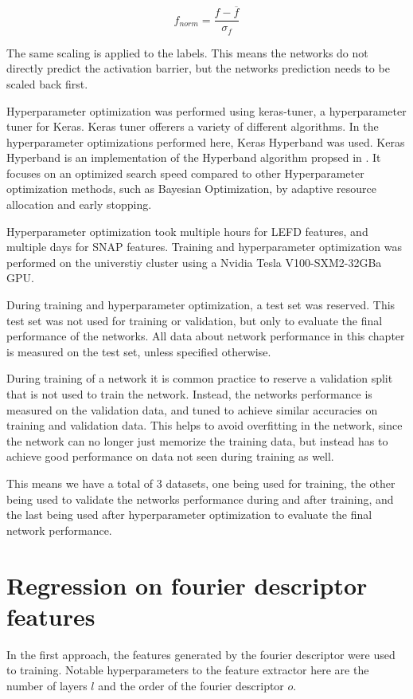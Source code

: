 $$
f_{norm} = \frac{f- \overline{f}}{\sigma_f}
$$

The same scaling is applied to the labels.
This means the networks do not directly predict the activation barrier, but the networks prediction needs to be scaled back first.

Hyperparameter optimization was performed using keras-tuner, a hyperparameter tuner for Keras.
Keras tuner offerers a variety of different algorithms.
In the hyperparameter optimizations performed here, Keras Hyperband was used.
Keras Hyperband is an  implementation of the Hyperband algorithm propsed in \cite{li2017hyperband}.
It focuses on an optimized search speed compared to other Hyperparameter optimization methods, such as
Bayesian Optimization, by adaptive resource allocation and early stopping.

Hyperparameter optimization took multiple hours for LEFD features, 
and multiple days for SNAP features.
Training and hyperparameter optimization was performed on the universtiy cluster %
using a Nvidia Tesla V100-SXM2-32GBa GPU.

During training and hyperparameter optimization, a test set was reserved.
This test set was not used for training or validation, but only to evaluate the final performance of the networks.
All data about network performance in this chapter is measured on the test set, unless specified otherwise.

During training of a network it is common practice to reserve a validation split that is not used to train the network.
Instead, the networks performance is measured on the validation data, and tuned to achieve similar accuracies on
training and validation data.
This helps to avoid overfitting in the network, since the network can no longer just memorize the training
data, but instead has to achieve good performance on data not seen during training as well.

This means we have a total of 3 datasets, one being used for training, the other being used to validate the networks
performance during and after training, and the last being used after hyperparameter optimization to evaluate the final network
performance.

\section{Regression on fourier descriptor features}
\label{sec:Evaluation:fourier}

In the first approach, the features generated by the fourier descriptor were used to training.
Notable hyperparameters to the feature extractor here are the number of layers $l$ and the order of the fourier descriptor $o$.

